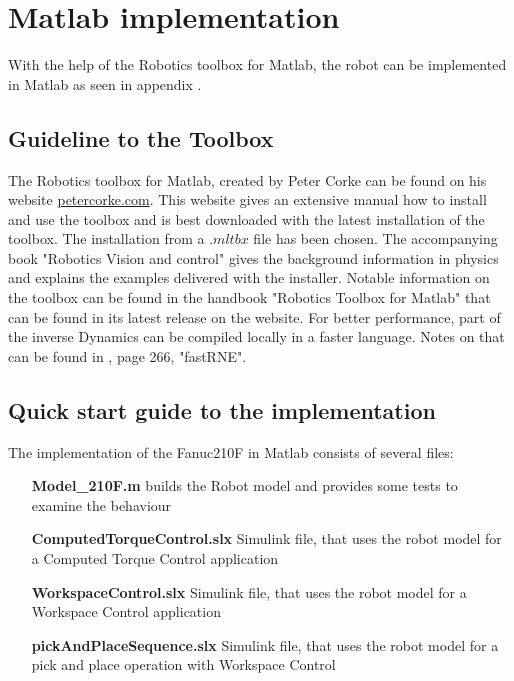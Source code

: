 \section{Matlab implementation}

With the help of the Robotics toolbox for Matlab, the robot can be implemented in Matlab as seen in appendix .

\subsection{Guideline to the Toolbox}

The Robotics toolbox for Matlab, created by Peter Corke can be found on his website \url{petercorke.com}. This website gives an extensive manual how to install and use the toolbox and is best downloaded with the latest installation of the toolbox. The installation from a $.mltbx$ file has been chosen. 
The accompanying book "Robotics Vision and control" gives the background information in physics and explains the examples delivered with the installer. Notable information on the toolbox can be found in the handbook "Robotics Toolbox for Matlab" that can be found in its latest release on the website.
For better performance, part of the inverse Dynamics can be compiled locally in a faster language. Notes on that can be found in \cite{CorkeRoboticVisionControl}, page 266, "fastRNE".

\subsection{Quick start guide to the implementation}
The implementation of the Fanuc210F in Matlab consists of several files:\\
\begin{itemize}[wide=\parindent]
	\item[\textbf{Model_210F.m}] builds the Robot model and provides some tests to examine the behaviour
	\item[\textbf{ComputedTorqueControl.slx}] Simulink file, that uses the robot model for a Computed Torque Control application
	\item[\textbf{WorkspaceControl.slx}] Simulink file, that uses the robot model for a Workspace Control application
	\item[\textbf{pickAndPlaceSequence.slx}] Simulink file, that uses the robot model for a pick and place operation with Workspace Control
\end{itemize}

